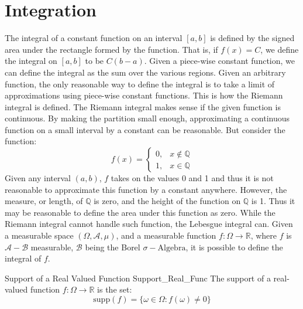         \section{Integration}
            The integral of a constant function on an interval
            $[a,b]$ is defined by the signed area under the
            rectangle formed by the function. That is, if
            $f(x)=C$, we define the integral on $[a,b]$ to
            be $C(b-a)$. Given a piece-wise constant function,
            we can define the integral as the sum over the
            various regions. Given an arbitrary function, the
            only reasonable way to define the integral is to
            take a limit of approximations using piece-wise
            constant functions. This is how the Riemann integral
            is defined. The Riemann integral makes sense if
            the given function is continuous. By making the
            partition small enough, approximating a continuous
            function on a small interval by a constant can be
            reasonable. But consider the function:
            \begin{equation}
                f(x)=
                \begin{cases}
                    0,&x\notin\mathbb{Q}\\
                    1,&x\in\mathbb{Q}
                \end{cases}
            \end{equation}
            Given any interval $(a,b)$, $f$ takes on the values
            0 and 1 and thus it is not reasonable to approximate
            this function by a constant anywhere. However,
            the measure, or length, of $\mathbb{Q}$ is zero, and
            the height of the function on $\mathbb{Q}$ is 1.
            Thus it may be reasonable to define the area under
            this function as zero. While the Riemann integral
            cannot handle such function, the Lebesgue integral
            can. Given a measurable space
            $(\Omega,\mathcal{A},\mu)$, and a measurable
            function $f:\Omega\rightarrow\mathbb{R}$, where
            $f$ is $\mathcal{A}-\mathcal{B}$ measurable,
            $\mathcal{B}$ being the Borel
            $\sigma-\textrm{Algebra}$, it is possible to define
            the integral of $f$.
            \begin{ldefinition}{Support of a Real Valued Function}
                  {Support_Real_Func}
                The support of a real-valued function
                $f:\Omega\rightarrow\mathbb{R}$ is the set:
                \begin{equation}
                    \mathrm{supp}(f)=\{\omega\in\Omega:f(\omega)\ne{0}\}
                \end{equation}
            \end{ldefinition}
